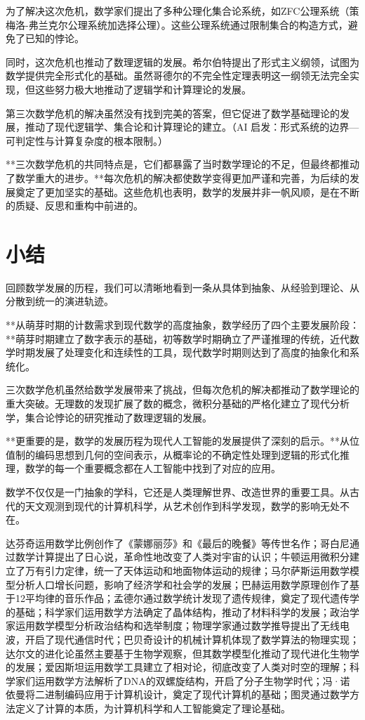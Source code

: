 为了解决这次危机，数学家们提出了多种公理化集合论系统，如ZFC公理系统（策梅洛-弗兰克尔公理系统加选择公理）。这些公理系统通过限制集合的构造方式，避免了已知的悖论。

同时，这次危机也推动了数理逻辑的发展。希尔伯特提出了形式主义纲领，试图为数学提供完全形式化的基础。虽然哥德尔的不完全性定理表明这一纲领无法完全实现，但这些努力极大地推动了逻辑学和计算理论的发展。

第三次数学危机的解决虽然没有找到完美的答案，但它促进了数学基础理论的发展，推动了现代逻辑学、集合论和计算理论的建立。{（AI 启发：形式系统的边界—可判定性与计算复杂度的根本限制。）}

**三次数学危机的共同特点是，它们都暴露了当时数学理论的不足，但最终都推动了数学重大的进步。**每次危机的解决都使数学变得更加严谨和完善，为后续的发展奠定了更加坚实的基础。这些危机也表明，数学的发展并非一帆风顺，是在不断的质疑、反思和重构中前进的。

\section{小结}
回顾数学发展的历程，我们可以清晰地看到一条从具体到抽象、从经验到理论、从分散到统一的演进轨迹。

**从萌芽时期的计数需求到现代数学的高度抽象，数学经历了四个主要发展阶段：**萌芽时期建立了数字表示的基础，初等数学时期确立了严谨推理的传统，近代数学时期发展了处理变化和连续性的工具，现代数学时期则达到了高度的抽象化和系统化。

三次数学危机虽然给数学发展带来了挑战，但每次危机的解决都推动了数学理论的重大突破。无理数的发现扩展了数的概念，微积分基础的严格化建立了现代分析学，集合论悖论的研究推动了数理逻辑的发展。

**更重要的是，数学的发展历程为现代人工智能的发展提供了深刻的启示。**从位值制的编码思想到几何的空间表示，从概率论的不确定性处理到逻辑的形式化推理，数学的每一个重要概念都在人工智能中找到了对应的应用。

数学不仅仅是一门抽象的学科，它还是人类理解世界、改造世界的重要工具。从古代的天文观测到现代的计算机科学，从艺术创作到科学发现，数学的影响无处不在。

达芬奇运用数学比例创作了《蒙娜丽莎》和《最后的晚餐》等传世名作；哥白尼通过数学计算提出了日心说，革命性地改变了人类对宇宙的认识；牛顿运用微积分建立了万有引力定律，统一了天体运动和地面物体运动的规律；马尔萨斯运用数学模型分析人口增长问题，影响了经济学和社会学的发展；巴赫运用数学原理创作了基于12平均律的音乐作品；孟德尔通过数学统计发现了遗传规律，奠定了现代遗传学的基础；科学家们运用数学方法确定了晶体结构，推动了材料科学的发展；政治学家运用数学模型分析政治结构和选举制度；物理学家通过数学推导提出了无线电波，开启了现代通信时代；巴贝奇设计的机械计算机体现了数学算法的物理实现；达尔文的进化论虽然主要基于生物学观察，但其数学模型化推动了现代进化生物学的发展；爱因斯坦运用数学工具建立了相对论，彻底改变了人类对时空的理解；科学家们运用数学方法解析了DNA的双螺旋结构，开启了分子生物学时代；冯·诺依曼将二进制编码应用于计算机设计，奠定了现代计算机的基础；图灵通过数学方法定义了计算的本质，为计算机科学和人工智能奠定了理论基础。

